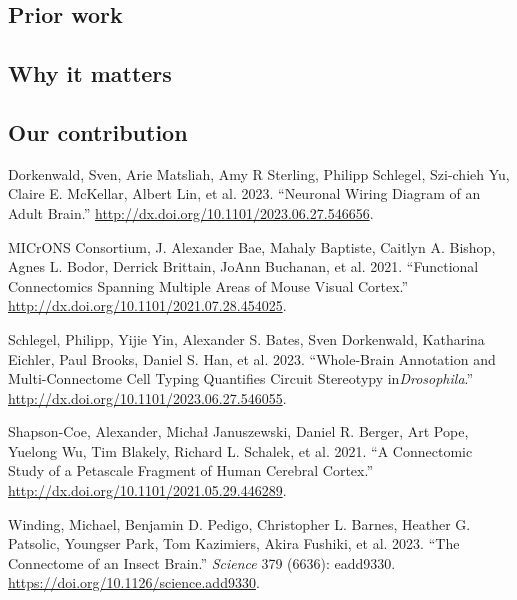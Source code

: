 \documentclass[
  letterpaper,
  DIV=11,
  numbers=noendperiod]{scrartcl}
\newlength{\cslhangindent}
\newlength{\cslentryspacingunit} %
\newenvironment{CSLReferences}[2] %
 {%
  \setlength{\parindent}{0pt}
  \ifodd #1
  \let\oldpar\par
  \def\par{\hangindent=\cslhangindent\oldpar}
  \fi
  \setlength{\parskip}{#2\cslentryspacingunit}
 }%
 {}
\begin{document}
\hypertarget{prior-work}{%
\subsection{Prior work}\label{prior-work}}

\hypertarget{why-it-matters}{%
\subsection{Why it matters}\label{why-it-matters}}

\hypertarget{our-contribution}{%
\subsection{Our contribution}\label{our-contribution}}

\hypertarget{refs}{}
\begin{CSLReferences}{1}{0}
\leavevmode{}%
Dorkenwald, Sven, Arie Matsliah, Amy R Sterling, Philipp Schlegel,
Szi-chieh Yu, Claire E. McKellar, Albert Lin, et al. 2023. {``Neuronal
Wiring Diagram of an Adult Brain.''}
\url{http://dx.doi.org/10.1101/2023.06.27.546656}.

\leavevmode{}%
MICrONS Consortium, J. Alexander Bae, Mahaly Baptiste, Caitlyn A.
Bishop, Agnes L. Bodor, Derrick Brittain, JoAnn Buchanan, et al. 2021.
{``Functional Connectomics Spanning Multiple Areas of Mouse Visual
Cortex.''} \url{http://dx.doi.org/10.1101/2021.07.28.454025}.

\leavevmode{}%
Schlegel, Philipp, Yijie Yin, Alexander S. Bates, Sven Dorkenwald,
Katharina Eichler, Paul Brooks, Daniel S. Han, et al. 2023.
{``Whole-Brain Annotation and Multi-Connectome Cell Typing Quantifies
Circuit Stereotypy in{\emph{Drosophila}}.''}
\url{http://dx.doi.org/10.1101/2023.06.27.546055}.

\leavevmode{}%
Shapson-Coe, Alexander, Michał Januszewski, Daniel R. Berger, Art Pope,
Yuelong Wu, Tim Blakely, Richard L. Schalek, et al. 2021. {``A
Connectomic Study of a Petascale Fragment of Human Cerebral Cortex.''}
\url{http://dx.doi.org/10.1101/2021.05.29.446289}.

\leavevmode{}%
Winding, Michael, Benjamin D. Pedigo, Christopher L. Barnes, Heather G.
Patsolic, Youngser Park, Tom Kazimiers, Akira Fushiki, et al. 2023.
{``The Connectome of an Insect Brain.''} \emph{Science} 379 (6636):
eadd9330. \url{https://doi.org/10.1126/science.add9330}.

\end{CSLReferences}
\end{document}
